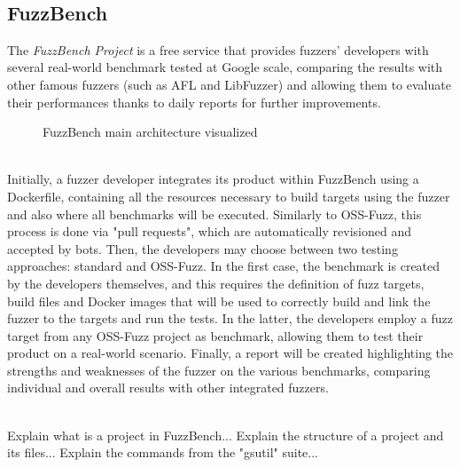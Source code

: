 \ \\
\subsection{FuzzBench}
The \textit{FuzzBench Project} is a free service that provides fuzzers' developers with several real-world benchmark tested at Google scale, comparing the results with other famous fuzzers (such as AFL and LibFuzzer) and allowing them to evaluate their performances thanks to daily reports for further improvements.
\cite{fuzzbench_docs}
\newline
\begin{figure}[h]
\caption{FuzzBench main architecture visualized \cite{fuzzbench_docs}}
\label{fig:fuzzbench_architecture}
\end{figure}
\ \\
Initially, a fuzzer developer integrates its product within FuzzBench using a Dockerfile, containing all the resources necessary to build targets using the fuzzer and also where all benchmarks will be executed.
\newline
Similarly to OSS-Fuzz, this process is done via "pull requests", which are automatically revisioned and accepted by bots.
\newline \newline
Then, the developers may choose between two testing approaches: standard and OSS-Fuzz.
\newline
In the first case, the benchmark is created by the developers themselves, and this requires the definition of fuzz targets, build files and Docker images that will be used to correctly build and link the fuzzer to the targets and run the tests.
\newline
In the latter, the developers employ a fuzz target from any OSS-Fuzz project as benchmark, allowing them to test their product on a real-world scenario.
\newline \newline
Finally, a report will be created highlighting the strengths and weaknesses of the fuzzer on the various benchmarks, comparing individual and overall results with other integrated fuzzers.

\ \\ \newline \newline \newline
Explain what is a project in FuzzBench...
\newline \newline
Explain the structure of a project and its files...
\newline \newline
Explain the commands from the "gsutil" suite...